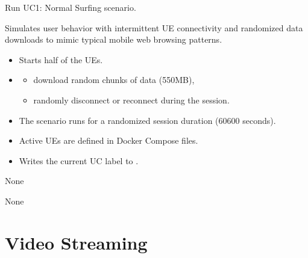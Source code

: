 \documentclass[letterpaper,10pt,english]{sphinxmanual}
\begin{document}
\begin{fulllineitems}
\label{\detokenize{uc1:uc1.run_uc1}}
\pysigstartsignatures
{}
\pysigstopsignatures
\sphinxAtStartPar
Run UC1: Normal Surfing scenario.

\sphinxAtStartPar
Simulates user behavior with intermittent UE connectivity and randomized data downloads
to mimic typical mobile web browsing patterns.
\begin{description}
\begin{itemize}
\item {} 
\sphinxAtStartPar
Starts half of the UEs.

\item {} \begin{description}
\begin{itemize}
\item {} 
\sphinxAtStartPar
download random chunks of data (5\textendash{}50MB),

\item {} 
\sphinxAtStartPar
randomly disconnect or reconnect during the session.

\end{itemize}

\end{description}

\item {} 
\sphinxAtStartPar
The scenario runs for a randomized session duration (60\textendash{}600 seconds).

\item {} 
\sphinxAtStartPar
Active UEs are defined in  Docker Compose files.

\item {} 
\sphinxAtStartPar
Writes the current UC label to .

\end{itemize}

\sphinxAtStartPar
None

\sphinxAtStartPar
None

\end{description}

\end{fulllineitems}


\sphinxstepscope


\chapter{Video Streaming}
\label{\detokenize{uc2:module-uc2}}\label{\detokenize{uc2:video-streaming}}\label{\detokenize{uc2::doc}}
\end{document}
